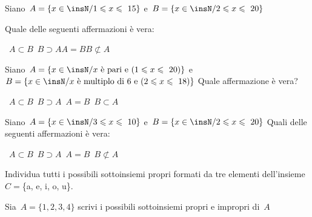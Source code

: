 \begin{esercizio}
\label{ese:7.39}
Siano~\(A=\{x\in\insN/1\leqslant x\leqslant~15\}\) e~\(B=\{x\in\insN/2\leqslant 
x\leqslant~20\}\)
\begin{center}

\end{center}
Quale delle seguenti affermazioni è vera:
\begin{center}
\boxA\quad~\(A\subset B\)\quad\boxB\quad~\(B\supset 
A\)\quad\boxC\quad\(A=B\)\quad\boxD\quad\(B\not\subset A\)
\end{center}
\end{esercizio}

\begin{esercizio}
\label{ese:7.40}
 Siano~\(A=\{x\in\insN/x \text{ è pari e }(1\leqslant x\leqslant~20)\}\) 
e~\(B=\{x\in\insN/x \text{ è multiplo di~6 e }(2\leqslant x\leqslant~18)\}\)
Quale affermazione è vera?
\begin{center}
 \boxA\quad~\(A\subset B\)\quad\boxB\quad~\(B\supset 
A\)\quad\boxC\quad~\(A=B\)\quad\boxD\quad~\(B\subset A\)
\end{center}
\end{esercizio}

\begin{esercizio}
\label{ese:7.41}
Siano~\(A=\{x\in\insN/3\leqslant x\leqslant~10\}\) e~\(B=\{x\in\insN/2\leqslant 
x\leqslant~20\}\)
Quali delle seguenti affermazioni è vera:
\begin{center}
 \boxA\quad~\(A\subset B\)\quad\boxB\quad~\(B\supset 
A\)\quad\boxC\quad~\(A=B\)\quad\boxD\quad~\(B\not\subset A\)
\end{center}
\end{esercizio}

\begin{esercizio}
\label{ese:7.42}
Individua tutti i possibili sottoinsiemi propri formati da tre elementi 
dell'insieme~\(C=\)\{a, e, i, o, u\}.
\end{esercizio}

\begin{esercizio}
\label{ese:7.43}
Sia~\(A=\{1,2,3,4\}\) scrivi i possibili sottoinsiemi propri e impropri di~\(A\)
\end{esercizio}

